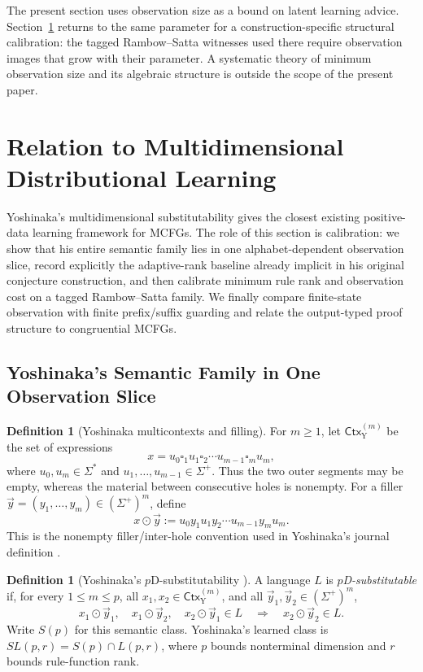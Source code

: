 \documentclass[11pt,a4paper]{article}
\numberwithin{equation}{section}
\theoremstyle{plain}
\theoremstyle{definition}
\newtheorem{definition}[theorem]{Definition}
\theoremstyle{remark}
\newcommand{\tuple}[1]{\vec{#1}}
\newcommand{\blank}{\square}
\begin{document}
The present section uses observation size as a bound on latent learning advice.
Section~\ref{sec:comparison} returns to the same parameter for a
construction-specific structural calibration: the tagged Rambow--Satta
witnesses used there require observation images that grow with their parameter.
A systematic theory of minimum observation size and its algebraic structure is
outside the scope of the present paper.

\section{Relation to Multidimensional Distributional Learning}
\label{sec:comparison}

Yoshinaka's multidimensional substitutability gives the closest existing
positive-data learning framework for MCFGs.  The role of this section is
calibration: we show that his entire semantic family lies in one
alphabet-dependent observation slice, record explicitly the adaptive-rank
baseline already implicit in his original conjecture construction, and then
calibrate minimum rule rank and observation cost on a tagged Rambow--Satta
family.  We finally compare finite-state observation with finite prefix/suffix
guarding and relate the output-typed proof structure to congruential MCFGs.

\subsection{Yoshinaka's Semantic Family in One Observation Slice}

\begin{definition}[Yoshinaka multicontexts and filling]
\label{def:yoshinaka-multicontexts}
For $m\ge1$, let $\mathsf{Ctx}_{\mathrm Y}^{(m)}$ be the set of expressions
\[
  x=u_0\blank_1u_1\blank_2\cdots
    u_{m-1}\blank_m u_m,
\]
where $u_0,u_m\in\Sigma^*$ and
$u_1,\ldots,u_{m-1}\in\Sigma^+$.  Thus the two outer segments may be empty,
whereas the material between consecutive holes is nonempty.  For a filler
$\tuple y=(y_1,\ldots,y_m)\in(\Sigma^+)^m$, define
\[
  x\odot\tuple y
  :=u_0y_1u_1y_2\cdots u_{m-1}y_mu_m.
\]
This is the nonempty filler/inter-hole convention used in Yoshinaka's journal
definition \cite[Section~3.1, p.~1824]{Yoshinaka2011}.
\end{definition}

\begin{definition}[Yoshinaka's \(p\)D-substitutability
{\cite[Section~3.1, p.~1824]{Yoshinaka2011}}]
\label{def:yoshinaka-pd-substitutability}
A language \(L\) is \emph{\(p\)D-substitutable} if, for every
\(1\le m\le p\), all \(x_1,x_2\in\mathsf{Ctx}_{\mathrm Y}^{(m)}\), and all
\(\tuple y_1,\tuple y_2\in(\Sigma^+)^m\),
\[
 x_1\odot\tuple y_1,\quad x_1\odot\tuple y_2,\quad
 x_2\odot\tuple y_1\in L
 \quad\Longrightarrow\quad
 x_2\odot\tuple y_2\in L.
\]
Write \(S(p)\) for this semantic class.  Yoshinaka's learned class is
\(SL(p,r)=S(p)\cap L(p,r)\), where \(p\) bounds nonterminal dimension and
\(r\) bounds rule-function rank.
\end{definition}
\end{document}
